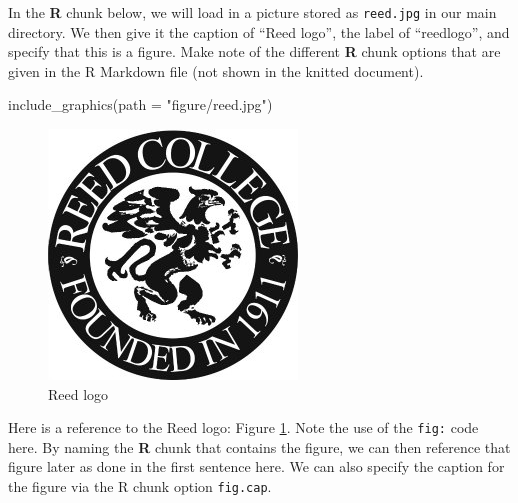 \documentclass[12pt,twoside]{reedthesis}
\newenvironment{Shaded}{\begin{snugshade}}{\end{snugshade}}
\newcommand{\AttributeTok}[1]{\textcolor[rgb]{0.77,0.63,0.00}{#1}}
\newcommand{\FunctionTok}[1]{\textcolor[rgb]{0.00,0.00,0.00}{#1}}
\newcommand{\NormalTok}[1]{#1}
\newcommand{\StringTok}[1]{\textcolor[rgb]{0.31,0.60,0.02}{#1}}
\begin{document}
In the \textbf{R} chunk below, we will load in a picture stored as \texttt{reed.jpg} in our main directory. We then give it the caption of ``Reed logo'', the label of ``reedlogo'', and specify that this is a figure. Make note of the different \textbf{R} chunk options that are given in the R Markdown file (not shown in the knitted document).
\begin{Shaded}
\begin{Highlighting}[]
\FunctionTok{include\_graphics}\NormalTok{(}\AttributeTok{path =} \StringTok{"figure/reed.jpg"}\NormalTok{)}
\end{Highlighting}
\end{Shaded}
\begin{figure}

{\centering \includegraphics[width=0.2\linewidth]{figure/reed} 

}

\caption{Reed logo}\label{fig:reedlogo}
\end{figure}
Here is a reference to the Reed logo: Figure \ref{fig:reedlogo}. Note the use of the \texttt{fig:} code here. By naming the \textbf{R} chunk that contains the figure, we can then reference that figure later as done in the first sentence here. We can also specify the caption for the figure via the R chunk option \texttt{fig.cap}.

\clearpage
\end{document}
